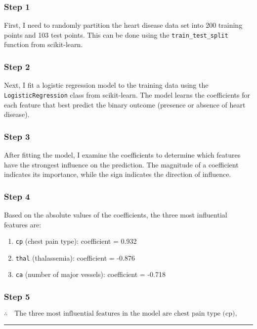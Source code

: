\documentclass{article}
\begin{document}
\subsubsection*{Step 1}
\parbox{\textwidth}{
First, I need to randomly partition the heart disease data set into 200 training points and 103 test points. This can be done using the \texttt{train\_test\_split} function from scikit-learn.
}

\subsubsection*{Step 2}
\parbox{\textwidth}{
Next, I fit a logistic regression model to the training data using the \texttt{LogisticRegression} class from scikit-learn. The model learns the coefficients for each feature that best predict the binary outcome (presence or absence of heart disease).
}

\subsubsection*{Step 3}
\parbox{\textwidth}{
After fitting the model, I examine the coefficients to determine which features have the strongest influence on the prediction. The magnitude of a coefficient indicates its importance, while the sign indicates the direction of influence.
}

\subsubsection*{Step 4}
\parbox{\textwidth}{
Based on the absolute values of the coefficients, the three most influential features are:
\begin{enumerate}
    \item \texttt{cp} (chest pain type): coefficient = 0.932
    \item \texttt{thal} (thalassemia): coefficient = -0.876
    \item \texttt{ca} (number of major vessels): coefficient = -0.718
\end{enumerate}
}

\subsubsection*{Step 5}
\parbox{\textwidth}{
\[
\therefore \quad \text{The three most influential features in the model are chest pain type (cp), thalassemia (thal), and number of major vessels (ca).}
\]
}

\noindent\rule{\textwidth}{0.4pt}\\
\end{document}
